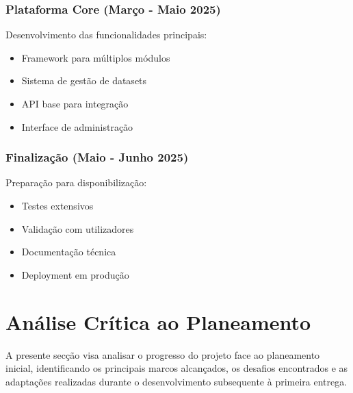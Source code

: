 \subsubsection{Plataforma Core (Março - Maio 2025)}
Desenvolvimento das funcionalidades principais:
\begin{itemize}
    \item Framework para múltiplos módulos
    \item Sistema de gestão de datasets
    \item API base para integração
    \item Interface de administração
\end{itemize}

\subsubsection{Finalização (Maio - Junho 2025)}
Preparação para disponibilização:
\begin{itemize}
    \item Testes extensivos
    \item Validação com utilizadores
    \item Documentação técnica
    \item Deployment em produção
\end{itemize}

\section{Análise Crítica ao Planeamento}

A presente secção visa analisar o progresso do projeto face ao planeamento inicial, identificando os principais marcos alcançados, os desafios encontrados e as adaptações realizadas durante o desenvolvimento subsequente à primeira entrega.

